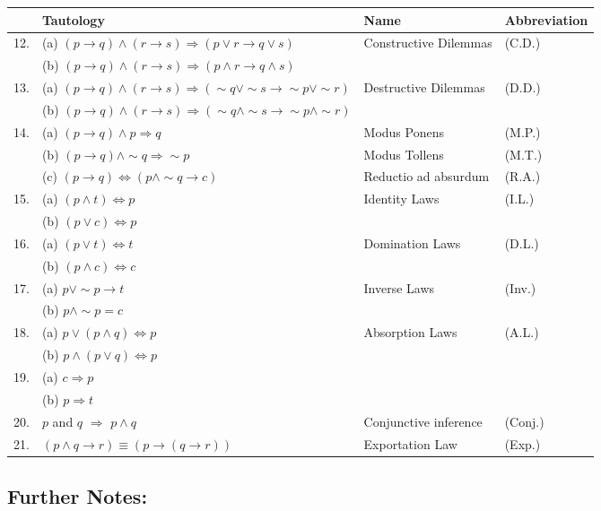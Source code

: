 \clearpage

\begin{tabular}{rlll}
&Tautology & Name & Abbreviation\\ \hline
12.	&(a) $(p\rightarrow q)\land (r\rightarrow s)\Rightarrow (p\lor r\rightarrow q\lor s)$ & Constructive Dilemmas & (C.D.) \\
	&(b) $(p\rightarrow q)\land (r\rightarrow s)\Rightarrow (p\land r\rightarrow q\land s)$  && \\
13.	&(a) $(p\rightarrow q)\land (r\rightarrow s)\Rightarrow (\sim q\lor \sim s\rightarrow \sim p\lor \sim r)$ & Destructive Dilemmas & (D.D.) \\
	&(b) $(p\rightarrow q)\land (r\rightarrow s)\Rightarrow (\sim q\land \sim s\rightarrow \sim p\land \sim r)$  && \\
14.	&(a) $(p\rightarrow q) \land p \Rightarrow q$ & Modus Ponens &(M.P.) \\
	&(b) $(p\rightarrow q) \land \sim q \Rightarrow \sim p$ & Modus Tollens &(M.T.) \\
	&(c) $(p\rightarrow q)\Leftrightarrow (p\land \sim q\rightarrow c)$ & Reductio ad absurdum & (R.A.)\\
15.	&(a) $(p\land t)\Leftrightarrow p$ & Identity Laws & (I.L.)\\
	&(b) $(p\lor c)\Leftrightarrow p$ &&\\
16.	&(a) $(p\lor t)\Leftrightarrow t$ & Domination Laws & (D.L.)\\
	&(b) $(p\land c)\Leftrightarrow c$ &&\\
17.	&(a) $p\lor\sim p\rightarrow t$ & Inverse Laws & (Inv.) \\
	&(b) $p\land\sim p=c$ &&\\
18.	&(a) $p\lor(p\land q)\Leftrightarrow p$& Absorption Laws & (A.L.)\\
	&(b) $p\land(p\lor q)\Leftrightarrow p$&&\\
19.	&(a) $c \Rightarrow p$ &&\\
	&(b) $p\Rightarrow t$ &&\\
20. & $p$ and $q$ $\Rightarrow$ $p\land q$ & Conjunctive inference & (Conj.)\\
21. & $(p\land q\rightarrow r)\equiv (p\rightarrow(q\rightarrow r))$ & Exportation Law& (Exp.)
\end{tabular}

\subsection*{Further Notes:}

